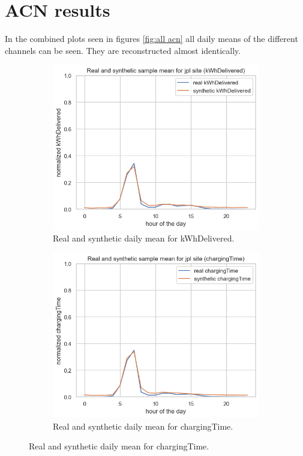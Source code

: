 \section{ACN results}
\label{subsec:ACN res}
In the combined plots seen in figures \ref{fig:all acn} all daily means of the different channels can be seen. They are reconstructed almost identically.
\begin{figure}
\begin{subfigure}{.45\textwidth}
  \centering
  \includegraphics[width=.8\linewidth]{images/jpl_day_mean_kwh.png}
  \caption{Real and synthetic daily mean for kWhDelivered.}
  \label{fig:kwh}
\end{subfigure}
\hfill
\begin{subfigure}{.45\textwidth}
  \centering
  \includegraphics[width=.8\linewidth]{images/jpl_day_mean_ct.png}
  \caption{Real and synthetic daily mean for chargingTime.}
  \label{fig:ct}
\end{subfigure}

\end{figure}
